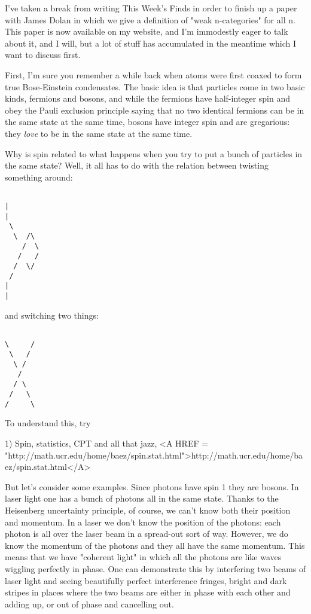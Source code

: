 



I've taken a break from writing This Week's Finds in order to
finish up a paper with James Dolan in which we give a definition of
"weak n-categories" for all n.  This paper is now available
on my website, and I'm immodestly eager to talk about it, and I will,
but a lot of stuff has accumulated in the meantime which I want to
discuss first.

First, I'm sure you remember a while back when atoms were first coaxed
to form true Bose-Einstein condensates.  The basic idea is that
particles come in two basic kinds, fermions and bosons, and while the
fermions have half-integer spin and obey the Pauli exclusion principle
saying that no two identical fermions can be in the same state at the
same time, bosons have integer spin and are gregarious: they \emph{love} to
be in the same state at the same time.

Why is spin related to what happens when you try to put a bunch of
particles in the same state?  Well, it all has to do with the relation
between twisting something around:


\begin{verbatim}

|
|
 \
  \  /\
    /  \
   /   /
  /  \/
 /
|
|

\end{verbatim}
    
and switching two things:


\begin{verbatim}

\     /
 \   /
  \ /
   /
  / \
 /   \
/     \

\end{verbatim}
    
To understand this, try

1) Spin, statistics, CPT and all that jazz,  <A HREF = "http://math.ucr.edu/home/baez/spin.stat.html">http://math.ucr.edu/home/baez/spin.stat.html</A>

But let's consider some examples.  Since photons have spin 1 they are
bosons.  In laser light one has a bunch of photons all in the
same state.  Thanks to the Heisenberg uncertainty principle, of
course, we can't know both their position and momentum.  In a laser we
don't know the position of the photons: each photon is all over the
laser beam in a spread-out sort of way.  However, we do know the
momentum of the photons and they all have the same momentum.  This
means that we have "coherent light" in which all the photons are like
waves wiggling perfectly in phase.  One can demonstrate this by
interfering two beams of laser light and seeing beautifully perfect
interference fringes, bright and dark stripes in places where the two
beams are either in phase with each other and adding up, or out of
phase and cancelling out.

